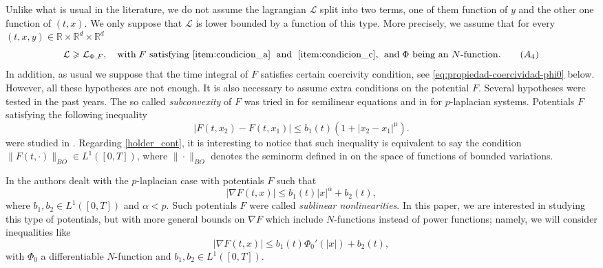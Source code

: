 \documentclass[twoside]{elsarticle}
\theoremstyle{remark}
\newcommand{\rr}{\mathbb{R}}
\renewcommand{\leq}{\leqslant}
\renewcommand{\geq}{\geqslant}
\begin{document}
 Unlike what is usual in the literature, we do not assume the lagrangian $\mathcal{L}$  split into two terms,
one of them function of $y$ and the other one function of $(t,x)$.
We only suppose that $\mathcal{L}$ is lower bounded by a function of this type. More precisely, we assume that for every $(t,x,y)\in\rr\times\rr^d\times\rr^d$
%
\begin{equation}\label{eq:control_inf}
\mathcal{L} \geq \mathcal{L}_{\Phi,F},\quad \text{with}\;F\text{ satisfying \ref{item:condicion_a} \;and\; \ref{item:condicion_c},
\;\text{and}\;$\Phi$ being an $N$-function}.\tag{$A_4$}
\end{equation}
%
In addition, as usual we suppose that the time integral of $F$ satisfies certain coercivity condition, see \eqref{eq:propiedad-coercividad-phi0} below.  However,  all these hypotheses are not enough. It is also necessary to assume extra conditions on the potential $F$.
Several hypotheses were tested in the past years. The so called \emph{subconvexity} of $F$ was tried in \cite{wu1999periodic,tang1995periodic,zhao2004periodic} for semilinear equations and in \cite{xu2007some,tang2010periodic} for $p$-laplacian systems. Potentials $F$ satisfying the following inequality
\begin{equation}\label{holder_cont}
  \left| F(t,x_2)- F(t,x_1) \right|\leq b_1(t)(1+|x_2-x_1|^{\mu}).
\end{equation}
 were studied in \cite{ABGMS2015}.
Regarding \eqref{holder_cont}, it is interesting to notice that such inequality is equivalent to say the condition
$\|F(t,\cdot)\|_{BO}\in L^1([0,T])$, where $\|\cdot\|_{BO}$ denotes the seminorm defined in  \cite[p. 125]{zhu2012analysis} on the space of functions of bounded variations.


 In \cite{tang1998periodic, tang2010periodic} the authors  dealt with the $p$-laplacian case
with potentials $F$ such that
\begin{equation}\label{eq:cota_pot} |\nabla F(t,x)|\leq b_1(t)|x|^{\alpha}+b_2(t),
 \end{equation}
where  $b_1,b_2 \in L^1([0,T])$ and $\alpha<p$. Such potentials $F$
were called  \emph{sublinear nonlinearities}. In this paper, we are interested in studying this type of potentials,
but with more general bounds on $\nabla F$ which include $N$-functions instead of power functions;
namely, we will consider inequalities like
\begin{equation}\label{holder_cont-mu}
  \left| \nabla F(t,x) \right|\leq b_1(t)\Phi_0'(|x|)+b_2(t),
  \tag{$A_5$}
\end{equation}
with $\Phi_0$  a differentiable $N$-function and $b_1,b_2 \in L^1([0,T])$.
\end{document}
